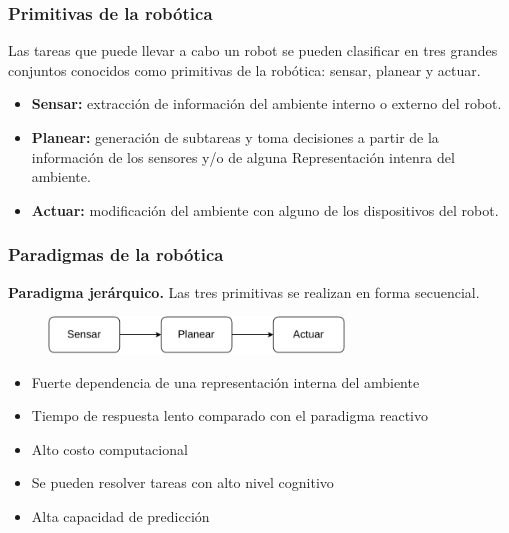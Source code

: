 \begin{frame}\frametitle{Primitivas de la robótica}
Las tareas que puede llevar a cabo un robot se pueden clasificar en tres grandes conjuntos conocidos como primitivas de la robótica: sensar, planear y actuar.
  \begin{itemize}
  \item \textbf{Sensar: } extracción de información del ambiente interno o externo del robot.
  \item \textbf{Planear: } generación de subtareas y toma decisiones a partir de la información de los sensores y/o de alguna Representación intenra del ambiente.
  \item \textbf{Actuar: } modificación del ambiente con alguno de los dispositivos del robot. 
  \end{itemize}
\end{frame}

\begin{frame}\frametitle{Paradigmas de la robótica}
  \textbf{Paradigma jerárquico.} Las tres primitivas se realizan en forma secuencial.
  \begin{figure}
    \centering
    \includegraphics[width=0.7\textwidth]{Figures/ParadigmHierarchical.pdf}
  \end{figure}
  \begin{itemize}
  \item Fuerte dependencia de una representación interna del ambiente
  \item Tiempo de respuesta lento comparado con el paradigma reactivo
  \item Alto costo computacional
  \item Se pueden resolver tareas con alto nivel cognitivo
  \item Alta capacidad de predicción
  \end{itemize}
\end{frame}


